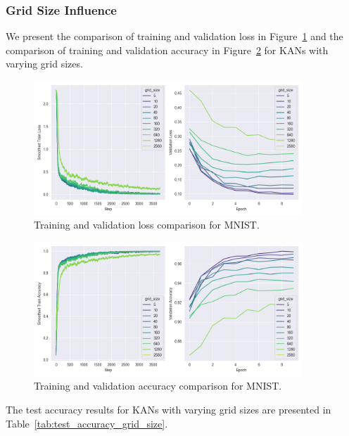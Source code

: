 \documentclass{article}
\begin{document}
\subsubsection{Grid Size Influence}\label{subsubsec:grid-size-influence}

We present the comparison of training and validation loss in Figure~\ref{fig:mnist_loss_grid_size}
and the comparison of training and validation accuracy in Figure~\ref{fig:mnist_accuracy_grid_size} for KANs with varying grid sizes.


\begin{figure}[H]
    \centering
    \includegraphics[width=0.9\textwidth]{pics/mnist_loss_grid_size}
    \caption{Training and validation loss comparison for MNIST.}
    \label{fig:mnist_loss_grid_size}
\end{figure}

\begin{figure}[H]
    \centering
    \includegraphics[width=0.9\textwidth]{pics/mnist_accuracy_grid_size}
    \caption{Training and validation accuracy comparison for MNIST.}
    \label{fig:mnist_accuracy_grid_size}
\end{figure}


The test accuracy results for KANs with varying grid sizes are presented in Table~\ref{tab:test_accuracy_grid_size}.
\end{document}
